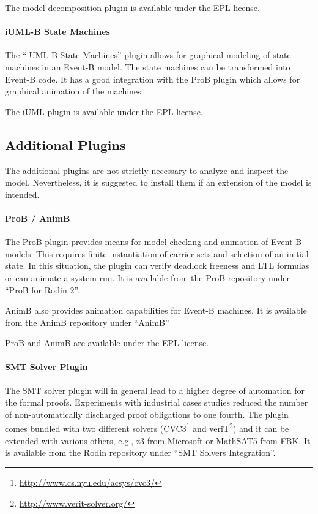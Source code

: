\documentclass{template/openetcs_article}
\begin{document}
The model decomposition plugin is available under the EPL license.

\paragraph{iUML-B State Machines}
\label{sec:iuml-b-state}

The ``iUML-B State-Machines'' plugin allows for graphical modeling of
state-machines in an Event-B model. The state machines can be transformed into
Event-B code. It has a good integration with the ProB plugin which allows for
graphical animation of the machines.

The iUML plugin is available under the EPL license.

\subsection{Additional Plugins}
\label{sec:additional-plugins}

The additional plugins are not strictly necessary to analyze and inspect the
model. Nevertheless, it is suggested to install them if an extension of the
model is intended.

\paragraph{ProB / AnimB}
\label{sec:prob}

The ProB plugin provides means for model-checking and animation of Event-B
models. This requires finite instantiation of carrier sets and selection of an
initial state. In this situation, the plugin can verify deadlock freeness and
LTL formulas or can animate a system run. It is available from the ProB
repository under ``ProB for Rodin 2''.

AnimB also provides animation capabilities for Event-B machines. It is available
from the AnimB repository under ``AnimB''

ProB and AnimB are available under the EPL license.

\paragraph{SMT Solver Plugin}
\label{sec:smt-solver-plugin}

The SMT solver plugin will in general lead to a higher degree of automation for
the formal proofs. Experiments with industrial cases studies reduced the number
of non-automatically discharged proof obligations to one fourth. The plugin
comes bundled with two different solvers
(CVC3\footnote{\url{http://www.cs.nyu.edu/acsys/cvc3/}} and
veriT\footnote{\url{http://www.verit-solver.org/}}) and it can be extended with
various others, e.g., z3 from Microsoft or MathSAT5 from FBK. It is available
from the Rodin repository under ``SMT Solvers Integration''.
\end{document}
